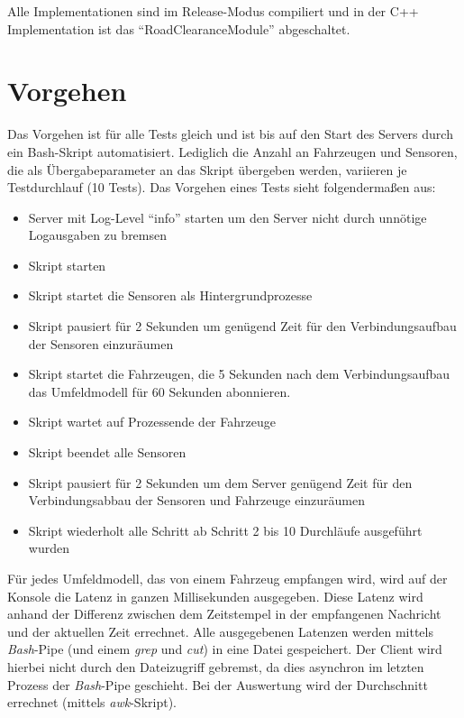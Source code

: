 Alle Implementationen sind im Release-Modus compiliert und in der C++ Implementation ist das \enquote{RoadClearanceModule} abgeschaltet.

\section{Vorgehen}
\label{eval:howto}

Das Vorgehen ist für alle Tests gleich und ist bis auf den Start des Servers durch ein Bash-Skript automatisiert.
Lediglich die Anzahl an Fahrzeugen und Sensoren, die als Übergabeparameter an das Skript übergeben werden, variieren je Testdurchlauf (10 Tests).
Das Vorgehen eines Tests sieht folgendermaßen aus:

\begin{itemize}
	\item Server mit Log-Level \enquote{info} starten um den Server nicht durch unnötige Logausgaben zu bremsen
	\item Skript starten
	\item Skript startet die Sensoren als Hintergrundprozesse
	\item Skript pausiert für 2 Sekunden um genügend Zeit für den Verbindungsaufbau der Sensoren einzuräumen
	\item Skript startet die Fahrzeugen, die 5 Sekunden nach dem Verbindungsaufbau das Umfeldmodell für 60 Sekunden abonnieren.
	\item Skript wartet auf Prozessende der Fahrzeuge
	\item Skript beendet alle Sensoren
	\item Skript pausiert für 2 Sekunden um dem Server genügend Zeit für den Verbindungsabbau der Sensoren und Fahrzeuge einzuräumen
	\item Skript wiederholt alle Schritt ab Schritt 2 bis 10 Durchläufe ausgeführt wurden
\end{itemize}

Für jedes Umfeldmodell, das von einem Fahrzeug empfangen wird, wird auf der Konsole die Latenz in ganzen Millisekunden ausgegeben.
Diese Latenz wird anhand der Differenz zwischen dem Zeitstempel in der empfangenen Nachricht und der aktuellen Zeit errechnet.
Alle ausgegebenen Latenzen werden mittels \textit{Bash}-Pipe (und einem \textit{grep} und \textit{cut}) in eine Datei gespeichert.
Der Client wird hierbei nicht durch den Dateizugriff gebremst, da dies asynchron im letzten Prozess der \textit{Bash}-Pipe geschieht.
Bei der Auswertung wird der Durchschnitt errechnet (mittels \textit{awk}-Skript).

